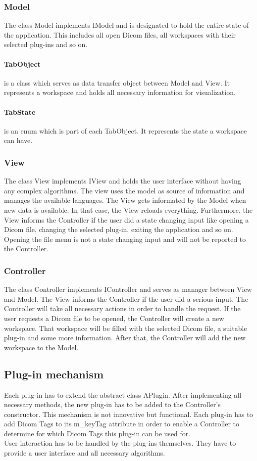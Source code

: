 \subsubsection{Model}
The class Model implements IModel and is designated to hold the entire state of the application. This includes all open Dicom files, all workspaces with their selected plug-ins and so on.
\paragraph{TabObject} is a class which serves as data transfer object between Model and View. It represents a workspace and holds all necessary information for visualization.
\paragraph{TabState} is an enum which is part of each TabObject. It represents the state a workspace can have.

\subsubsection{View}
The class View implements IView and holds the user interface without having any complex algorithms. The view uses the model as source of information and manages the available languages. The View gets informated by the Model when new data is available. In that case, the View reloads everything. Furthermore, the View informs the Controller if the user did a state changing input like opening a Dicom file, changing the selected plug-in, exiting the application and so on. Opening the file menu is not a state changing input and will not be reported to the Controller.

\subsubsection{Controller}
The class Controller implements IController and serves as manager between View and Model. The View informs the Controller if the user did a serious input. The Controller will take all necessary actions in order to handle the request. If the user requests a Dicom file to be opened, the Controller will create a new workspace. That workspace will be filled with the selected Dicom file, a suitable plug-in and some more information. After that, the Controller will add the new workspace to the Model.

\subsection{Plug-in mechanism}
Each plug-in has to extend the abstract class APlugin. After implementing all necessary methods, the new plug-in has to be added to the Controller's constructor. This mechanism is not innovative but functional. Each plug-in has to add Dicom Tags to its m\_keyTag attribute in order to enable a Controller to determine for which Dicom Tags this plug-in can be used for.\\
User interaction has to be handled by the plug-ins themselves. They have to provide a user interface and all necessary algorithms. 
